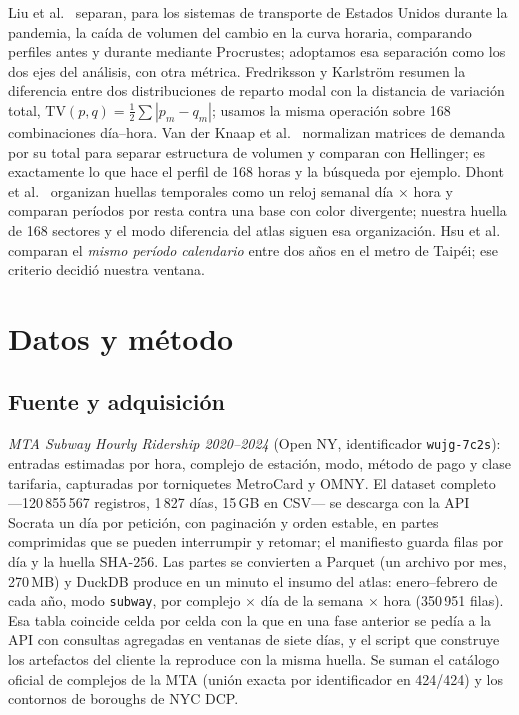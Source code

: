 \IfFileExists{IEEEtran.cls}{\documentclass[conference]{IEEEtran}}{\documentclass[10pt,twocolumn]{article}}
\begin{document}
Liu et al.\ \cite{liu2020} separan, para los sistemas de transporte de Estados Unidos durante la pandemia, la caída de volumen del cambio en la curva horaria, comparando perfiles antes y durante mediante Procrustes; adoptamos esa separación como los dos ejes del análisis, con otra métrica. Fredriksson y Karlström \cite{fredriksson2025} resumen la diferencia entre dos distribuciones de reparto modal con la distancia de variación total, $\mathrm{TV}(p,q)=\tfrac12\sum|p_m-q_m|$; usamos la misma operación sobre 168 combinaciones día--hora. Van der Knaap et al.\ \cite{vanderknaap2024} normalizan matrices de demanda por su total para separar estructura de volumen y comparan con Hellinger; es exactamente lo que hace el perfil de 168 horas y la búsqueda por ejemplo. Dhont et al.\ \cite{dhont2020} organizan huellas temporales como un reloj semanal día $\times$ hora y comparan períodos por resta contra una base con color divergente; nuestra huella de 168 sectores y el modo diferencia del atlas siguen esa organización. Hsu et al.\ \cite{hsu2021} comparan el \emph{mismo período calendario} entre dos años en el metro de Taipéi; ese criterio decidió nuestra ventana.

\section{Datos y método}
\label{sec:datos}

\subsection{Fuente y adquisición}

\emph{MTA Subway Hourly Ridership 2020--2024} (Open NY, identificador \texttt{wujg-7c2s}): entradas estimadas por hora, complejo de estación, modo, método de pago y clase tarifaria, capturadas por torniquetes MetroCard y OMNY. El dataset completo ---120\,855\,567 registros, 1\,827 días, 15\,GB en CSV--- se descarga con la API Socrata un día por petición, con paginación y orden estable, en partes comprimidas que se pueden interrumpir y retomar; el manifiesto guarda filas por día y la huella SHA-256. Las partes se convierten a Parquet (un archivo por mes, 270\,MB) y DuckDB produce en un minuto el insumo del atlas: enero--febrero de cada año, modo \texttt{subway}, por complejo $\times$ día de la semana $\times$ hora (350\,951 filas). Esa tabla coincide celda por celda con la que en una fase anterior se pedía a la API con consultas agregadas en ventanas de siete días, y el script que construye los artefactos del cliente la reproduce con la misma huella. Se suman el catálogo oficial de complejos de la MTA (unión exacta por identificador en 424/424) y los contornos de boroughs de NYC DCP.
\end{document}

